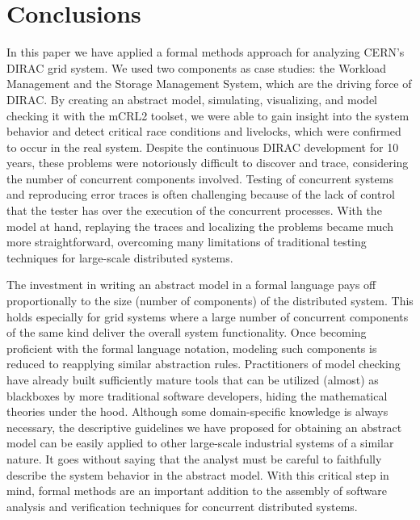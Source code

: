 \documentclass[sort&compress,preprint,3p]{elsarticle}
\begin{document}
\section{Conclusions}
\label{sec:Section_5}
In this paper we have applied a formal methods approach for analyzing CERN's 
DIRAC grid system. 
We used two components as case studies: the Workload
Management and the Storage Management System, which are the driving force 
of DIRAC.
By creating an abstract model, simulating, visualizing, and model checking it with the mCRL2 toolset,
we were able to gain insight into the system behavior and detect critical
race conditions and livelocks, which  
were confirmed to occur in the real system. 
Despite the continuous DIRAC development for 10 years, these problems 
were notoriously difficult to discover and trace, considering the number of concurrent components involved. 
Testing of concurrent systems and reproducing error traces is often challenging because of the lack of 
control that the tester has over the execution of the concurrent processes. 
With the model at hand, replaying
the traces and localizing the problems became much more straightforward, overcoming many limitations of
traditional testing techniques for large-scale distributed systems. 

The investment in writing an abstract model in a formal language 
pays off proportionally to the size (number of components) of the distributed system. 
This holds especially for grid systems where a large number of concurrent
 components of the same kind deliver the overall system functionality. 
Once becoming proficient with
the formal language notation, modeling such components is
reduced to reapplying similar abstraction rules.
Practitioners
of model checking have already built sufficiently mature tools
that can be utilized (almost) as blackboxes by more traditional
software developers, hiding the mathematical theories under
the hood. Although some domain-specific knowledge is always necessary,
the descriptive guidelines we have proposed for obtaining
an abstract model can be easily 
applied to other large-scale industrial systems of a similar nature.
It goes without saying that the analyst must be careful to faithfully
describe the system behavior in the abstract model. With this critical step in mind, formal methods
are an important addition to the assembly of software analysis and verification techniques for concurrent distributed systems.
\end{document}
